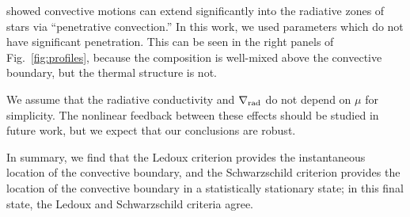 \citet{anders_etal_2022} showed convective motions can extend significantly into the radiative zones of stars via ``penetrative convection.''
In this work, we used parameters which do not have significant penetration.
This can be seen in the right panels of Fig.~\ref{fig:profiles}, because the composition is well-mixed above the convective boundary, but the thermal structure is not.

We assume that the radiative conductivity and $\nabla_{\rm{rad}}$ do not depend on $\mu$ for simplicity.
The nonlinear feedback between these effects should be studied in future work, but we expect that our conclusions are robust.

In summary, we find that the Ledoux criterion provides the instantaneous location of the convective boundary, and the Schwarzschild criterion provides the location of the convective boundary in a statistically stationary state; in this final state, the Ledoux and Schwarzschild criteria agree.
